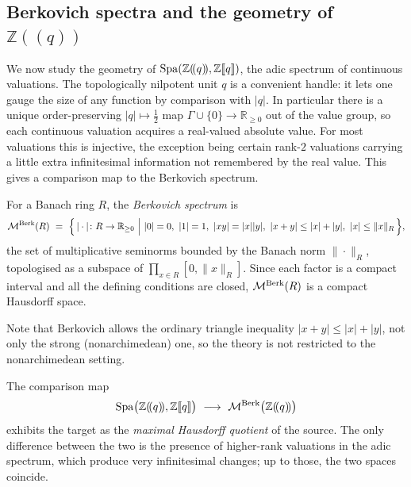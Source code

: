 \subsection{Berkovich spectra and the geometry of \texorpdfstring{$\mathbb{Z}(\!(q)\!)$}{Z((q))}}

We now study the geometry of $\operatorname{Spa}(\mathbb{Z}(\!(q)\!),\mathbb{Z}[\![q]\!])$,
the adic spectrum of continuous valuations. The topologically nilpotent unit
$q$ is a convenient handle: it lets one gauge the size of any function by
comparison with $|q|$. In particular there is a unique order-preserving
$|q|\mapsto\tfrac12$ map $\Gamma\cup\{0\}\to\mathbb{R}_{\ge0}$ out of the value
group, so each continuous valuation acquires a real-valued absolute value. For
most valuations this is injective, the exception being certain rank-$2$
valuations carrying a little extra infinitesimal information not remembered by
the real value. This gives a comparison map to the Berkovich spectrum.

\begin{definition}
\label{def:12:berkovich}
For a Banach ring $R$, the \emph{Berkovich spectrum} is
\begin{equation*}
\MBerk(R)\ =\ \Bigl\{\,|\cdot|\colon R\to\mathbb{R}_{\ge0}\ \Big|\
|0|=0,\ |1|=1,\ |xy|=|x||y|,\ |x+y|\le|x|+|y|,\ |x|\le\|x\|_R\,\Bigr\},
\end{equation*}
the set of multiplicative seminorms bounded by the Banach norm $\|\cdot\|_R$,
topologised as a subspace of $\prod_{x\in R}[0,\|x\|_R]$. Since each factor is a
compact interval and all the defining conditions are closed, $\mathcal{M}^{\mathrm{Berk}}(R)$ is a
compact Hausdorff space.
\end{definition}

Note that Berkovich allows the ordinary triangle inequality $|x+y|\le|x|+|y|$,
not only the strong (nonarchimedean) one, so the theory is not restricted to the
nonarchimedean setting.

\begin{proposition}
\label{prop:12:spa-berk}
The comparison map
\begin{equation*}
\Spa\bigl(\mathbb{Z}(\!(q)\!),\mathbb{Z}[\![q]\!]\bigr)\ \longrightarrow\
\MBerk\bigl(\mathbb{Z}(\!(q)\!)\bigr)
\end{equation*}
exhibits the target as the \emph{maximal Hausdorff quotient} of the source. The
only difference between the two is the presence of higher-rank valuations in the
adic spectrum, which produce very infinitesimal changes; up to those, the two
spaces coincide.
\end{proposition}

